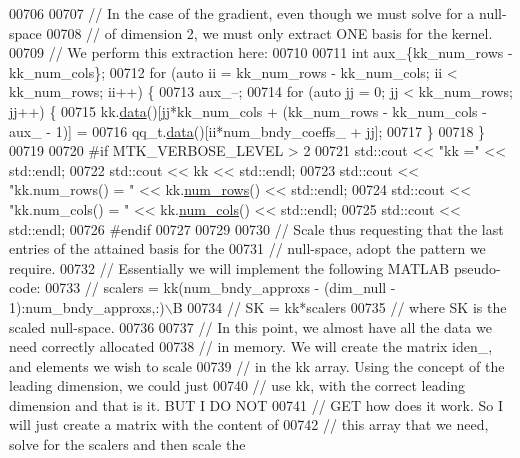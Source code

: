 \begin{DoxyCode}
{{00706 
00707   \textcolor{comment}{// In the case of the gradient, even though we must solve for a null-space}
00708   \textcolor{comment}{// of dimension 2, we must only extract ONE basis for the kernel.}
00709   \textcolor{comment}{// We perform this extraction here:}
00710 
00711   \textcolor{keywordtype}{int} aux\_\{kk\_num\_rows - kk\_num\_cols\};
00712   \textcolor{keywordflow}{for} (\textcolor{keyword}{auto} ii = kk\_num\_rows - kk\_num\_cols; ii < kk\_num\_rows; ii++) \{
00713     aux\_--;
00714     \textcolor{keywordflow}{for} (\textcolor{keyword}{auto} jj = 0; jj < kk\_num\_rows; jj++) \{
00715       kk.\hyperlink{classmtk_1_1DenseMatrix_a0c33b8a9e01d157c61ddbdf807c25d84}{data}()[jj*kk\_num\_cols + (kk\_num\_rows - kk\_num\_cols - aux\_ - 1)] =
00716         qq\_t.\hyperlink{classmtk_1_1DenseMatrix_a0c33b8a9e01d157c61ddbdf807c25d84}{data}()[ii*num\_bndy\_coeffs\_ + jj];
00717     \}
00718   \}
00719 
00720 \textcolor{preprocessor}{  #if MTK\_VERBOSE\_LEVEL > 2}
00721   std::cout << \textcolor{stringliteral}{"kk ="} << std::endl;
00722   std::cout << kk << std::endl;
00723   std::cout << \textcolor{stringliteral}{"kk.num\_rows() = "} << kk.\hyperlink{classmtk_1_1DenseMatrix_a53f3afb3b6a8d21854458aaa9663cc74}{num\_rows}() << std::endl;
00724   std::cout << \textcolor{stringliteral}{"kk.num\_cols() = "} << kk.\hyperlink{classmtk_1_1DenseMatrix_a41747502d468c6728a4be31501b16e0e}{num\_cols}() << std::endl;
00725   std::cout << std::endl;
00726 \textcolor{preprocessor}{  #endif}
00727 
00729 
00730   \textcolor{comment}{// Scale thus requesting that the last entries of the attained basis for the}
00731   \textcolor{comment}{// null-space, adopt the pattern we require.}
00732   \textcolor{comment}{// Essentially we will implement the following MATLAB pseudo-code:}
00733   \textcolor{comment}{//  scalers = kk(num\_bndy\_approxs - (dim\_null - 1):num\_bndy\_approxs,:)\(\backslash\)B}
00734   \textcolor{comment}{//  SK = kk*scalers}
00735   \textcolor{comment}{// where SK is the scaled null-space.}
00736 
00737   \textcolor{comment}{// In this point, we almost have all the data we need correctly allocated}
00738   \textcolor{comment}{// in memory. We will create the matrix iden\_, and elements we wish to scale}
00739   \textcolor{comment}{// in the kk array. Using the concept of the leading dimension, we could just}
00740   \textcolor{comment}{// use kk, with the correct leading dimension and that is it. BUT I DO NOT}
00741   \textcolor{comment}{// GET how does it work. So I will just create a matrix with the content of}
00742   \textcolor{comment}{// this array that we need, solve for the scalers and then scale the}
}}
\end{DoxyCode}
